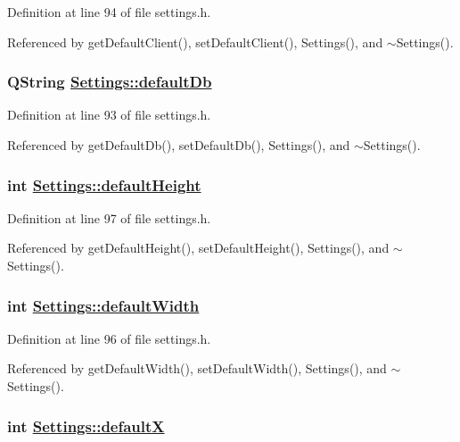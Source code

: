 Definition at line 94 of file settings.h.

Referenced by get\-Default\-Client(), set\-Default\-Client(), Settings(), and $\sim$Settings().\hypertarget{classSettings_r3}{
\subsubsection[defaultDb]{\setlength{\rightskip}{0pt plus 5cm}QString \hyperlink{classSettings_r3}{Settings::default\-Db}}}
\label{classSettings_r3}


Definition at line 93 of file settings.h.

Referenced by get\-Default\-Db(), set\-Default\-Db(), Settings(), and $\sim$Settings().\hypertarget{classSettings_r6}{
\subsubsection[defaultHeight]{\setlength{\rightskip}{0pt plus 5cm}int \hyperlink{classSettings_r6}{Settings::default\-Height}}}
\label{classSettings_r6}


Definition at line 97 of file settings.h.

Referenced by get\-Default\-Height(), set\-Default\-Height(), Settings(), and $\sim$Settings().\hypertarget{classSettings_r5}{
\subsubsection[defaultWidth]{\setlength{\rightskip}{0pt plus 5cm}int \hyperlink{classSettings_r5}{Settings::default\-Width}}}
\label{classSettings_r5}


Definition at line 96 of file settings.h.

Referenced by get\-Default\-Width(), set\-Default\-Width(), Settings(), and $\sim$Settings().\hypertarget{classSettings_r7}{
\subsubsection[defaultX]{\setlength{\rightskip}{0pt plus 5cm}int \hyperlink{classSettings_r7}{Settings::default\-X}}}
\label{classSettings_r7}


